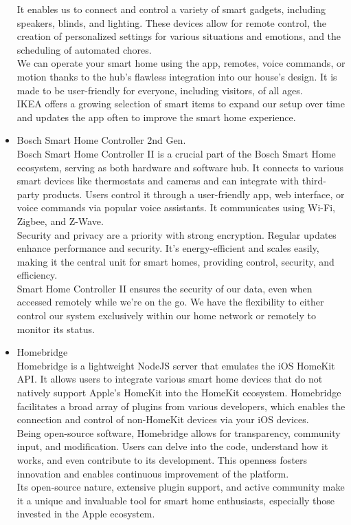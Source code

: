 \documentclass[conference]{IEEEtran}
\begin{document}
\begin{itemize}
It enables us to connect and control a variety of smart gadgets, including speakers, blinds, and lighting. These devices allow for remote control, the creation of personalized settings for various situations and emotions, and the scheduling of automated chores.\\
We can operate your smart home using the app, remotes, voice commands, or motion thanks to the hub's flawless integration into our house's design. It is made to be user-friendly for everyone, including visitors, of all ages.\\
IKEA offers a growing selection of smart items to expand our setup over time and updates the app often to improve the smart home experience.\\
\item Bosch Smart Home Controller 2nd Gen.\\
Bosch Smart Home Controller II is a crucial part of the Bosch Smart Home ecosystem, serving as both hardware and software hub. It connects to various smart devices like thermostats and cameras and can integrate with third-party products. Users control it through a user-friendly app, web interface, or voice commands via popular voice assistants. It communicates using Wi-Fi, Zigbee, and Z-Wave.\\
Security and privacy are a priority with strong encryption. Regular updates enhance performance and security. It's energy-efficient and scales easily, making it the central unit for smart homes, providing control, security, and efficiency.\\
Smart Home Controller II ensures the security of our data, even when accessed remotely while we’re on the go. We have the flexibility to either control our system exclusively within our home network or remotely to monitor its status.\\
\item Homebridge\\
Homebridge is a lightweight NodeJS server that emulates the iOS HomeKit API. It allows users to integrate various smart home devices that do not natively support Apple’s HomeKit into the HomeKit ecosystem. Homebridge facilitates a broad array of plugins from various developers, which enables the connection and control of non-HomeKit devices via your iOS devices.\\
Being open-source software, Homebridge allows for transparency, community input, and modification. Users can delve into the code, understand how it works, and even contribute to its development. This openness fosters innovation and enables continuous improvement of the platform.\\
Its open-source nature, extensive plugin support, and active community make it a unique and invaluable tool for smart home enthusiasts, especially those invested in the Apple ecosystem.\\
\end{itemize}
\end{document}
